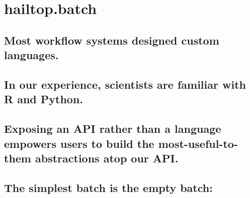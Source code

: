\documentclass[sigconf, nonacm]{acmart}
\begin{document}









\section{hailtop.batch}

\subsection{Most workflow systems designed custom languages.}

\subsection{In our experience, scientists are familiar with R and Python.}

\subsection{Exposing an API rather than a language empowers users to build the most-useful-to-them abstractions atop our API.}

\subsection{The simplest batch is the empty batch:}
\end{document}

